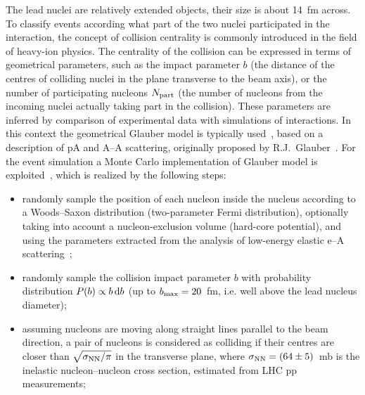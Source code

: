 The lead nuclei are relatively extended objects, their size is about 14~fm across. To classify events according what part of the two nuclei participated in the interaction, the concept of collision centrality is commonly introduced in the field of heavy-ion physics. The centrality of the collision can be expressed in terms of geometrical parameters, such as the impact parameter $b$  (the distance of the centres of colliding nuclei in the plane transverse to the beam axis), or the number of participating nucleons $N_{\rm part}$ (the number of nucleons from the incoming nuclei actually taking part in the collision). These parameters are inferred by comparison of experimental data with simulations of interactions. In this context the geometrical Glauber model is typically used~\cite{Miller:2007ri}, based on a description of pA and A--A scattering, originally proposed by R.J.~Glauber~\cite{Glauber:1955qq,Glauber:2006gd}. For the event simulation a Monte Carlo implementation of Glauber model is exploited~\cite{Shor:1988vk,Alver:2008aq}, which is realized by the following steps:
\begin{itemize}
    \item{randomly sample the position of each nucleon inside the nucleus according to a Woods--Saxon distribution (two-parameter Fermi distribution), optionally taking into account a nucleon-exclusion volume (hard-core potential), and using the parameters extracted from the analysis of low-energy elastic e--A scattering~\cite{DeJager:1987qc};}
    \item{randomly sample the collision impact parameter $b$ with probability distribution $P(b) \propto b \, {\rm d}b$ (up to $b_{\rm max} = 20$~fm, i.e. well above the lead nucleus diameter);}
    \item{assuming nucleons are moving along straight lines parallel to the beam direction, a pair of nucleons is considered as colliding if their centres are closer than $\sqrt{\sigma_{\rm NN}/\pi}$ in the transverse plane, where $\sigma_{\rm NN} = (64 \pm 5)$~mb is the inelastic nucleon--nucleon cross section, estimated from LHC pp measurements;}
\end{itemize}
